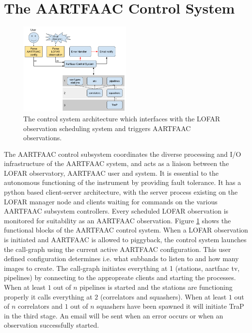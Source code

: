 \documentclass{ws-jai}
\begin{document}
\section {\label{sec:acontrol} The AARTFAAC Control System}
\begin{figure}[htbp]
\centering
\includegraphics[width=0.50\textwidth]{Figs/acs.png}
\caption{The  control  system  architecture  which  interfaces  with  the  LOFAR
  observation scheduling system and triggers AARTFAAC observations.}
\label{fig:afaac_ctrl_sys}
\end{figure}
The  AARTFAAC  control subsystem  coordinates  the  diverse processing  and
I/O infrastructure of the  AARTFAAC system, and acts as a  liaison between the
LOFAR observatory,  AARTFAAC user  and  system.   It is  essential  to the
autonomous functioning of  the instrument by  providing fault  tolerance.  It
has  a python based client-server architecture, with the  server process
existing on the LOFAR manager node and clients waiting for  commands on the
various AARTFAAC subsystem controllers. Every scheduled  LOFAR observation is
monitored  for suitability as an AARTFAAC  observation. Figure
\ref{fig:afaac_ctrl_sys} shows  the functional blocks of  the AARTFAAC control
system.   When a LOFAR observation is  initiated and AARTFAAC is allowed to
piggyback, the control  system launches  the  call-graph using  the  current
active  AARTFAAC configuration.  This  user defined configuration determines
i.e. what subbands to  listen to and how many  images to  create.  The
call-graph initiates  everything at  1 (stations, aartfaac tv,  pipelines) by
connecting to the appropreate clients and starting the processes. When at least
$1$ out of $n$ pipelines is started  and the stations are functioning properly
it calls everything at  $2$ (correlators and squashers). When at least $1$ out
of $n$ correlators and $1$ out of $n$ squashers have been spawned it will
initiate TraP in the third stage. An  email will be sent when an error occurs
or when an observation successfully started.\\
\end{document}
